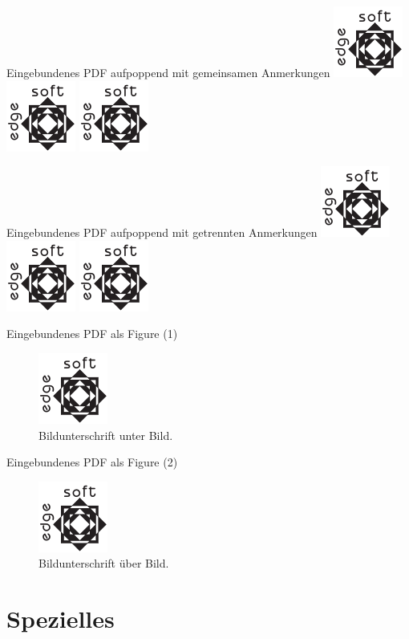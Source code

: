 	\begin{frame}{Eingebundenes PDF aufpoppend mit gemeinsamen Anmerkungen}
		\includegraphics<1->{testlogo}
		\includegraphics<2->{testlogo}
		\includegraphics<3->{testlogo}
	\end{frame}

	\begin{frame}{Eingebundenes PDF aufpoppend mit getrennten Anmerkungen}
		\includegraphics<1->{testlogo}
		\includegraphics<2->{testlogo}
		\includegraphics<3->{testlogo}
	\end{frame}

	\begin{frame}{Eingebundenes PDF als Figure (1)}
		\begin{figure}
			\includegraphics{testlogo}
			\caption{Bildunterschrift unter Bild.}
		\end{figure}
	\end{frame}

	\begin{frame}{Eingebundenes PDF als Figure (2)}
		\begin{figure}
			\caption{Bildunterschrift über Bild.}
			\includegraphics{testlogo}
		\end{figure}
	\end{frame}

	\section{Spezielles}

